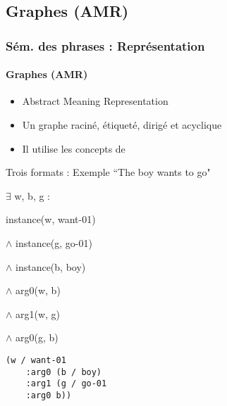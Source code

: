 \documentclass[xcolor=table]{beamer}
\begin{document}
\subsection{Graphes (AMR)}

\begin{frame}[fragile]
	\frametitle{Sém. des phrases : Représentation}
	\framesubtitle{Graphes (AMR)}
	
	\begin{itemize}
		\item Abstract Meaning Representation \cite{2013-banarescu-al}
		\item Un graphe raciné, étiqueté, dirigé et acyclique
		\item Il utilise les concepts de 
	\end{itemize}

	\begin{exampleblock}{Trois formats : Exemple ``The boy wants to go"}
		\begin{minipage}{.3\textwidth}
			
			\footnotesize
			$ \exists $ w, b, g : 
			
			instance(w, want-01) 
			
			$ \wedge $ instance(g, go-01) 
			
			$ \wedge $ instance(b, boy) 
			
			$ \wedge $ arg0(w, b) 
			
			$ \wedge $ arg1(w, g) 
			
			$ \wedge $ arg0(g, b)
		\end{minipage}
		\begin{minipage}{.35\textwidth}
			
			\begin{verbatim}
(w / want-01
    :arg0 (b / boy)
    :arg1 (g / go-01
    :arg0 b))
			\end{verbatim}
			
		\end{minipage}
		\begin{minipage}{.3\textwidth}
			
		\end{minipage}
	\end{exampleblock}
	
\end{frame}
\end{document}
